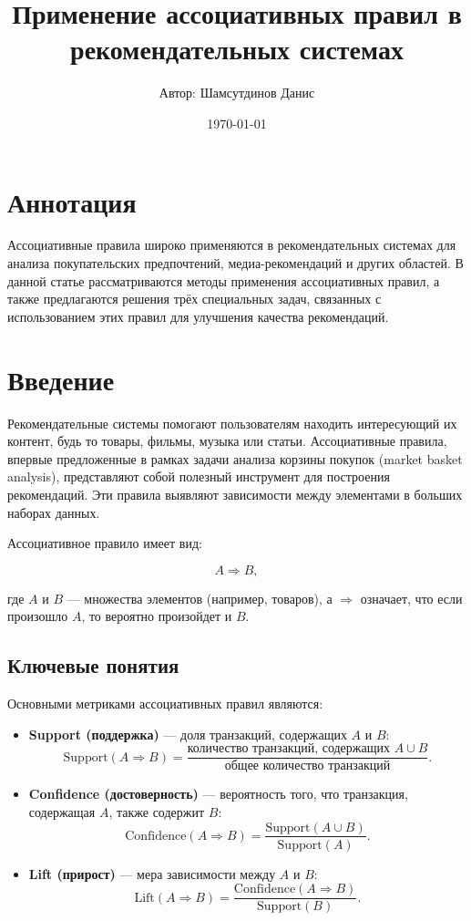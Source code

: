 \documentclass[a4paper,12pt]{article}
\title{\textbf{Применение ассоциативных правил в рекомендательных системах}}
\author{Автор: Шамсутдинов Данис}
\date{\today}
\begin{document}
\maketitle

\section*{Аннотация}
Ассоциативные правила широко применяются в рекомендательных системах для анализа покупательских предпочтений, медиа-рекомендаций и других областей. В данной статье рассматриваются методы применения ассоциативных правил, а также предлагаются решения трёх специальных задач, связанных с использованием этих правил для улучшения качества рекомендаций.

\tableofcontents

\newpage

\section{Введение}
Рекомендательные системы помогают пользователям находить интересующий их контент, будь то товары, фильмы, музыка или статьи. Ассоциативные правила, впервые предложенные в рамках задачи анализа корзины покупок (market basket analysis), представляют собой полезный инструмент для построения рекомендаций. Эти правила выявляют зависимости между элементами в больших наборах данных.

Ассоциативное правило имеет вид:

\begin{equation}
A \Rightarrow B,
\end{equation}

где $A$ и $B$ — множества элементов (например, товаров), а $\Rightarrow$ означает, что если произошло $A$, то вероятно произойдет и $B$.

\subsection{Ключевые понятия}

Основными метриками ассоциативных правил являются:

\begin{itemize}
  \item \textbf{Support (поддержка)} — доля транзакций, содержащих $A$ и $B$:
    \[\text{Support}(A \Rightarrow B) = \frac{\text{количество транзакций, содержащих } A \cup B}{\text{общее количество транзакций}}.\]
  \item \textbf{Confidence (достоверность)} — вероятность того, что транзакция, содержащая $A$, также содержит $B$:
    \[\text{Confidence}(A \Rightarrow B) = \frac{\text{Support}(A \cup B)}{\text{Support}(A)}.\]
  \item \textbf{Lift (прирост)} — мера зависимости между $A$ и $B$:
    \[\text{Lift}(A \Rightarrow B) = \frac{\text{Confidence}(A \Rightarrow B)}{\text{Support}(B)}.\]
\end{itemize}
\end{document}
